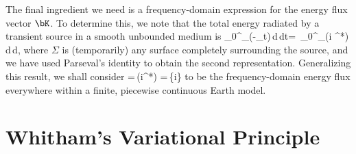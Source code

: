 The final ingredient we need is a frequency-domain expression
for the energy flux vector $\bK$. To determine this,
we note that the total energy radiated by a transient source
%
%
in a smooth unbounded medium is
\eq \label{15.Erad}
\int_0^{\infty}\!\!\!\int_{\Sigma}\bnh\cdot(-\p_t\bs\cdot\bT)\,d\/\Sigma\,dt=
\,\!\int_0^{\infty}\!\!\!\int_{\Sigma}\bnh\cdot(i\om
\bs^*\cdot\bT)\,d\/\Sigma\,d\om,
\en
where $\Sigma$ is (temporarily) any surface completely surrounding the source,
and we have used Parseval's identity to obtain the second representation.
Generalizing this result, we shall consider
\eq \label{15.Kdef}
\bK=\,(i\om\bs^*\cdot\bT)
=\,\{i\om[\kappa\hspace{0.2 mm}\bs^*(\bdel\cdot\bs)
+2\mu(\bs^*\cdot\bd)]\}
\en
to be the frequency-domain energy flux everywhere within a finite,
piecewise continuous Earth model.

\section{Whitham's Variational Principle}
%
%
%
%
\label{15.sec.slow}

